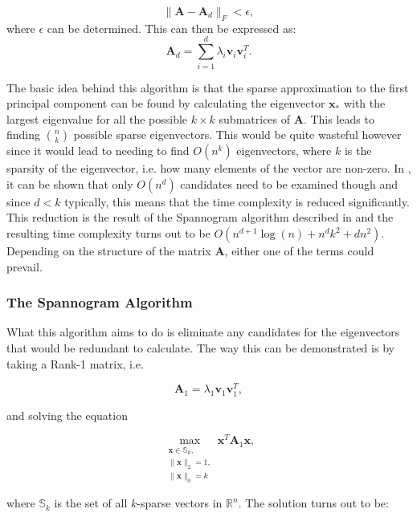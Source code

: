 \documentclass[11pt,a4paper]{article}
\begin{document}
\begin{equation*}
\|\mathbf{A} - \mathbf{A}_d\|_F < \epsilon,
\end{equation*}
where $\epsilon$ can be determined. This can then be expressed as:
\begin{equation*}
\mathbf{A}_d = \sum_{i=1}^d \lambda_i \mathbf{v}_i \mathbf{v}_i^T.
\end{equation*}

The basic idea behind this algorithm is that the sparse approximation to the first principal component can be found by calculating the eigenvector $\mathbf{x}_*$ with the largest eigenvalue for all the possible $k\times k$ submatrices of $\mathbf{A}$. This leads to finding $n \choose k$ possible sparse eigenvectors. This would be quite wasteful however since it would lead to needing to find $O\left( n^k\right)$ eigenvectors, where $k$ is the sparsity of the eigenvector, i.e. how many elements of the vector are non-zero. In \cite{dimakis}, it can be shown that only $O\left(n^d\right)$ candidates need to be examined though and since $d < k$ typically, this means that the time complexity is reduced significantly. This reduction is the result of the Spannogram algorithm described in \cite{dimakis} and the resulting time complexity turns out to be $O \left( n^{d+1}\log(n) + n^d k^2 + dn^2\right)$. Depending on the structure of the matrix $\mathbf{A}$, either one of the terms could prevail.

\subsubsection{The Spannogram Algorithm}

What this algorithm aims to do is eliminate any candidates for the eigenvectors that would be redundant to calculate. The way this can be demonstrated is by taking a Rank-1 matrix, i.e.

\begin{equation*}
\mathbf{A}_1 = \lambda_1 \mathbf{v}_1 \mathbf{v}_1^T,
\end{equation*}

and solving the equation

\begin{equation*}
\max_{\substack{\mathbf{x} \in\mathbb{S}_k, \\ \|\mathbf{x}\|_2 = 1, \\ \|\mathbf{x}\|_0 = k}} \mathbf{x}^T\mathbf{A}_1\mathbf{x},
\end{equation*}

where $\mathbb{S}_k$ is the set of all $k$-sparse vectors in $\mathbb{R}^n$. The solution turns out to be:
\end{document}
